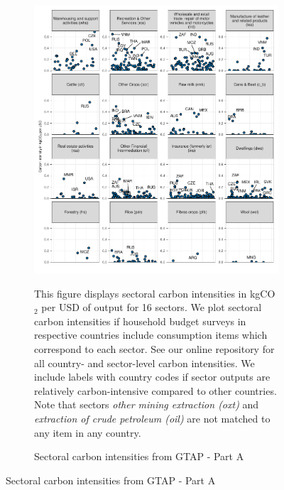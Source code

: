 \begin{figure}[ht!]
  \centering
  \caption{Sectoral carbon intensities from GTAP} \label{fig:GTAP}\label{fig:B}
  \begin{subfigure}[b]{\textwidth}
  \centering
  \includegraphics{Analysis_Carbon_Intensities_GTAP/Figure_2.1.1_A_2017B.pdf}
  \caption{Sectoral carbon intensities from GTAP - Part A} \label{fig:B1}  
  \begin{subcaption2}
    This figure displays sectoral carbon intensities in kgCO$_{2}$ per USD of output for 16 sectors. We plot sectoral carbon intensities if household budget surveys in respective countries include consumption items which correspond to each sector. See our online repository for all country- and sector-level carbon intensities. We include labels with country codes if sector outputs are relatively carbon-intensive compared to other countries. Note that sectors \textit{other mining extraction (oxt)} and \textit{extraction of crude petroleum (oil)} are not matched to any item in any country.
  \end{subcaption2}
\end{subfigure}
\end{figure}

\clearpage

